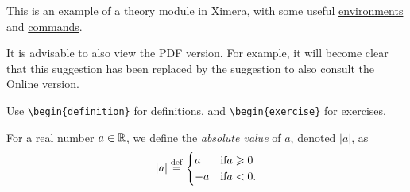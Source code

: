 \documentclass{ximera}
\begin{document}
    \author{Wim Obbels}
    \label{xim:ximeraDemo}

This is an example of a theory module in Ximera, 
with some useful \hyperref[xim:ximeraEnvironments]{environments} and \hyperref[xim:ximeraCommands]{commands}.

\begin{onlineOnly}
 \begin{remark}
    It is advisable to also view the PDF version. 
    For example, it will become clear that this suggestion has been replaced by the suggestion to also consult the Online version.
 \end{remark}
\end{onlineOnly}

Use \verb|\begin{definition}| for definitions, and \verb|\begin{exercise}| for exercises.

\begin{definition}\label{showcase:absolutevalue}\nl 

	For a real number $a\in\mathbb{R}$, we define the \textit{absolute value} of $a$, denoted $|a|$, as
	\[
		|a| \overset{\mathrm{def}}{=} \begin{cases}
				         a  & \text{if} a \geqslant 0 \\
				        -a  & \text{if} a<0.
			        \end{cases}
	\]
\end{definition}
\end{document}
